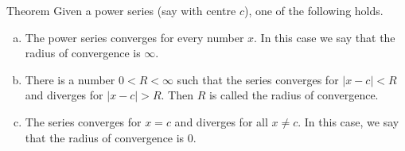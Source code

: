 \begin{frame}[t]
\begin{block}{Theorem}
Given a power series (say with centre $c$), one of the
following holds.
\begin{enumerate}[(a)]
\item The power series converges for every number $x$. In this case we say that
the radius of convergence is $\infty$.
\begin{center}
\end{center}\pause
\item There is a number $0<R<\infty$ such that the series converges
for $|x-c|<R$ and diverges for $|x-c|>R$. Then $R$ is called the radius
of convergence.
\begin{center}
\end{center}\pause
\item The series converges for $x=c$ and diverges for all $x\ne c$.
In this case, we say that the radius of convergence is $0$.
\begin{center}
\end{center}
\end{enumerate}
\end{block}
\end{frame}
